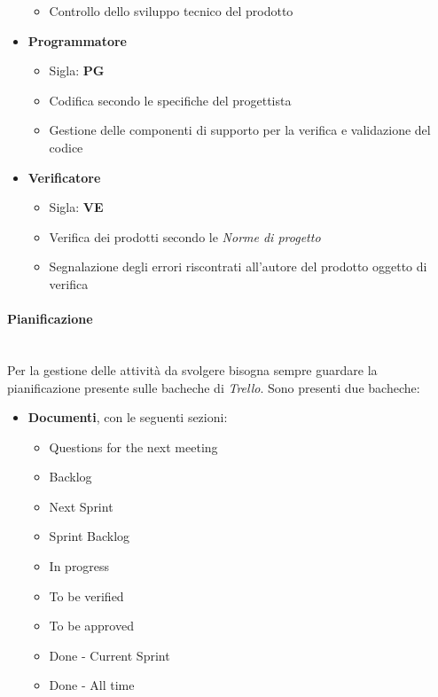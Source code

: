 \begin{itemize}
\begin{itemize}
        \item Controllo dello sviluppo tecnico del prodotto
    \end{itemize}
    \item \textbf{Programmatore}
    \begin{itemize}
        \item Sigla: \textbf{PG}
        \item Codifica secondo le specifiche del progettista
        \item Gestione delle componenti di supporto per la verifica e validazione del codice
    \end{itemize}
    \item \textbf{Verificatore}
    \begin{itemize}
        \item Sigla: \textbf{VE}
        \item Verifica dei prodotti secondo le \textit{Norme di progetto}
        \item Segnalazione degli errori riscontrati all'autore del prodotto oggetto di verifica
    \end{itemize}
\end{itemize}

\paragraph{Pianificazione}
\mbox{}\\
Per la gestione delle attività da svolgere bisogna sempre guardare la pianificazione presente sulle bacheche di \textit{Trello}.
Sono presenti due bacheche:
\begin{itemize}
    \item \textbf{Documenti}, con le seguenti sezioni: 
    \begin{itemize}
        \item Questions for the next meeting
        \item Backlog
        \item Next Sprint
        \item Sprint Backlog
        \item In progress
        \item To be verified
        \item To be approved
        \item Done - Current Sprint
        \item Done - All time
    \end{itemize}
\end{itemize}

